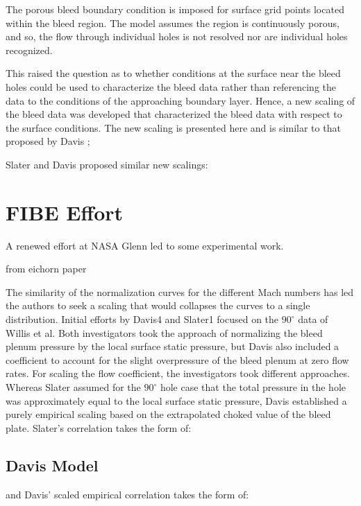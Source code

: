 The porous bleed boundary condition is imposed for surface grid points located within the bleed region. The model assumes the region is continuously porous, and so, the flow through individual holes is not resolved nor are individual holes recognized.

This raised the question as to whether conditions at the surface near the bleed holes could be used to characterize the bleed data rather than referencing the data  to the conditions of the approaching boundary layer. Hence, a new scaling of the bleed data was developed that characterized the bleed data with respect to the surface conditions. The new scaling is presented here and is similar to that proposed by Davis \cite{Davis2012}; 

Slater and Davis proposed similar new scalings:

\section{FIBE Effort}

A renewed effort at NASA Glenn led to some experimental work. 

from eichorn paper

The similarity of the normalization curves for the different Mach numbers has led the authors to seek a scaling that would collapses the curves to a single distribution. Initial efforts by Davis4 and Slater1 focused on the $90^\circ$ data of Willis et al. Both investigators took the approach of normalizing the bleed plenum pressure by the local surface static pressure, but Davis also included a coefficient to account for the slight overpressure of the bleed plenum at zero flow rates. For scaling the flow coefficient, the investigators took different approaches. Whereas Slater assumed for the $90^\circ$ hole case that the total pressure in the hole was approximately equal to the local surface static pressure, Davis established a purely empirical scaling based on the extrapolated choked value of the bleed plate. Slater’s correlation takes the form of:

\subsection{Davis Model}

and Davis' scaled empirical correlation takes the form of:

